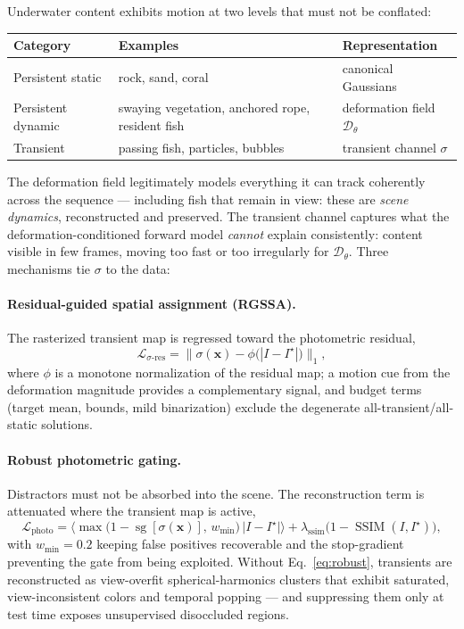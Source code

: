 \documentclass[11pt,a4paper]{article}
\newcommand{\I}{I}
\newcommand{\sg}{\operatorname{sg}}
\newcommand{\Lcal}{\mathcal{L}}
\begin{document}
Underwater content exhibits motion at two levels that must not be conflated:
\begin{center}
\begin{tabular}{@{}lll@{}}
\toprule
\textbf{Category} & \textbf{Examples} & \textbf{Representation} \\
\midrule
Persistent static & rock, sand, coral & canonical Gaussians \\
Persistent dynamic & swaying vegetation, anchored rope, resident fish & deformation field $\mathcal{D}_\theta$ \\
Transient & passing fish, particles, bubbles & transient channel $\sigma$ \\
\bottomrule
\end{tabular}
\end{center}
The deformation field legitimately models everything it can track coherently across the sequence --- including fish that remain in view: these are \emph{scene dynamics}, reconstructed and preserved. The transient channel captures what the deformation-conditioned forward model \emph{cannot} explain consistently: content visible in few frames, moving too fast or too irregularly for $\mathcal{D}_\theta$. Three mechanisms tie $\sigma$ to the data:

\paragraph{Residual-guided spatial assignment (RGSSA).}
The rasterized transient map is regressed toward the photometric residual,
\begin{equation}
    \Lcal_{\sigma\text{-res}} = \big\| \sigma(\mathbf{x}) - \phi\big(|\I - \I^\star|\big) \big\|_1,
\end{equation}
where $\phi$ is a monotone normalization of the residual map; a motion cue from the deformation magnitude provides a complementary signal, and budget terms (target mean, bounds, mild binarization) exclude the degenerate all-transient/all-static solutions.

\paragraph{Robust photometric gating.}
Distractors must not be absorbed into the scene. The reconstruction term is attenuated where the transient map is active,
\begin{equation}
    \Lcal_{\text{photo}}
    =
    \Big\langle \max\big(1-\sg[\sigma(\mathbf{x})],\, w_{\min}\big)\,\big|\I-\I^\star\big| \Big\rangle
    +
    \lambda_{\text{ssim}} \big(1-\operatorname{SSIM}(\I, \I^\star)\big),
    \label{eq:robust}
\end{equation}
with $w_{\min}{=}0.2$ keeping false positives recoverable and the stop-gradient preventing the gate from being exploited. Without Eq.~\eqref{eq:robust}, transients are reconstructed as view-overfit spherical-harmonics clusters that exhibit saturated, view-inconsistent colors and temporal popping --- and suppressing them only at test time exposes unsupervised disoccluded regions.
\end{document}
